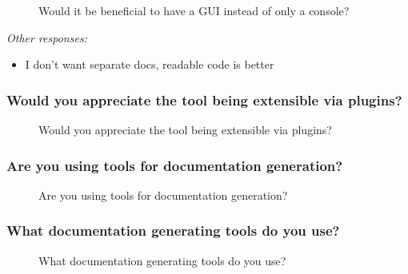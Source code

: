 \begin{figure}[H]
    \centering
    \caption{Would it be beneficial to have a GUI instead of only a console?}
\end{figure}

\textit{Other responses:}
\begin{itemize}
    \item I don't want separate docs, readable code is better
\end{itemize}

\subsubsection*{Would you appreciate the tool being extensible via plugins?}

\begin{figure}[H]
    \centering
    \caption{Would you appreciate the tool being extensible via plugins?}
\end{figure}

\subsubsection*{Are you using tools for documentation generation?}

\begin{figure}[H]
    \centering
    \caption{Are you using tools for documentation generation?}
\end{figure}

\subsubsection*{What documentation generating tools do you use?}

\begin{figure}[H]
    \centering
    \caption{What documentation generating tools do you use?}
\end{figure}

